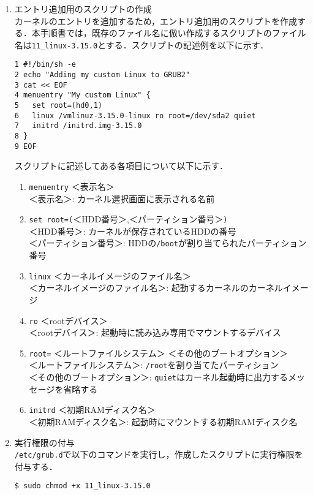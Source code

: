 \documentclass[12pt]{jsarticle}
\begin{document}
\begin{enumerate}
  \begin{enumerate}
  \item エントリ追加用のスクリプトの作成\\
    カーネルのエントリを追加するため，エントリ追加用のスクリプトを作成する．本手順書では，既存のファイル名に倣い作成するスクリプトのファイル名は\verb|11_linux-3.15.0|とする．スクリプトの記述例を以下に示す．
\begin{verbatim}
1 #!/bin/sh -e
2 echo "Adding my custom Linux to GRUB2"
3 cat << EOF
4 menuentry "My custom Linux" {
5   set root=(hd0,1)
6   linux /vmlinuz-3.15.0-linux ro root=/dev/sda2 quiet
7   initrd /initrd.img-3.15.0
8 }
9 EOF
\end{verbatim}
スクリプトに記述してある各項目について以下に示す．
    \begin{enumerate}
    \item \verb|menuentry| ＜表示名＞ \\
      ＜表示名＞: カーネル選択画面に表示される名前
    \item \verb|set root=(|＜HDD番号＞,＜パーティション番号＞\verb|)| \\
      ＜HDD番号＞: カーネルが保存されているHDDの番号 \\
      ＜パーティション番号＞: HDDの\verb|/boot|が割り当てられたパーティション番号
    \item \verb|linux| ＜カーネルイメージのファイル名＞ \\
      ＜カーネルイメージのファイル名＞: 起動するカーネルのカーネルイメージ
    \item \verb|ro| ＜rootデバイス＞\\
      ＜rootデバイス＞: 起動時に読み込み専用でマウントするデバイス
    \item \verb|root=| ＜ルートファイルシステム＞ ＜その他のブートオプション＞\\
      ＜ルートファイルシステム＞: \verb|/root|を割り当てたパーティション \\
      ＜その他のブートオプション＞: \verb|quiet|はカーネル起動時に出力するメッセージを省略する
    \item \verb|initrd| ＜初期RAMディスク名＞ \\
      ＜初期RAMディスク名＞: 起動時にマウントする初期RAMディスク名
    \end{enumerate}
    
  \item 実行権限の付与\\
    \verb|/etc/grub.d|で以下のコマンドを実行し，作成したスクリプトに実行権限を付与する．
\begin{verbatim}
$ sudo chmod +x 11_linux-3.15.0
\end{verbatim}


\end{enumerate}
\end{enumerate}
\end{document}

